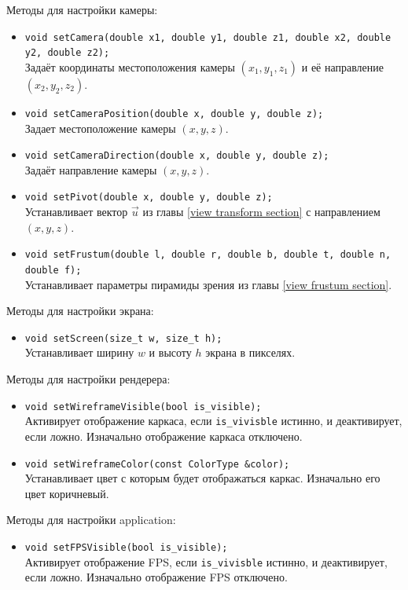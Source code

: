 \documentclass{article}
\begin{document}
Методы для настройки камеры:
\begin{itemize}
	\item \verb"void setCamera(double x1, double y1, double z1, double x2, double y2, double z2);" \\
	Задаёт координаты местоположения камеры $(x_{1}, y_{1}, z_{1})$ и её направление $(x_{2}, y_{2}, z_{2})$.
	\item \verb"void setCameraPosition(double x, double y, double z);" \\
	Задает местоположение камеры $(x, y, z)$.
	\item \verb"void setCameraDirection(double x, double y, double z);" \\
	Задаёт направление камеры $(x, y, z)$.
	\item \verb"void setPivot(double x, double y, double z);" \\
	Устанавливает вектор $\vec{u}$ из главы \ref{view transform section} с направлением $(x, y, z)$.
	\item \verb"void setFrustum(double l, double r, double b, double t, double n, double f);" \\
	Устанавливает параметры пирамиды зрения из главы \ref{view frustum section}.
\end{itemize}

Методы для настройки экрана:
\begin{itemize}
	\item \verb"void setScreen(size_t w, size_t h);" \\
	Устанавливает ширину $w$ и высоту $h$ экрана в пикселях.
\end{itemize}

Методы для настройки рендерера:
\begin{itemize}
	\item \verb"void setWireframeVisible(bool is_visible);" \\
	Активирует отображение каркаса, если \verb"is_vivisble" истинно, и деактивирует, если ложно.
	Изначально отображение каркаса отключено.
	\item \verb"void setWireframeColor(const ColorType &color);" \\
	Устанавливает цвет с которым будет отображаться каркас.
	Изначально его цвет коричневый.
\end{itemize}

Методы для настройки application:
\begin{itemize}
	\item \verb"void setFPSVisible(bool is_visible);" \\
	Активирует отображение FPS, если \verb"is_vivisble" истинно, и деактивирует, если ложно.
	Изначально отображение FPS отключено.
\end{itemize}
\end{document}
